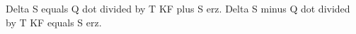 Delta S equals Q dot divided by T KF plus S erz.  
Delta S minus Q dot divided by T KF equals S erz.